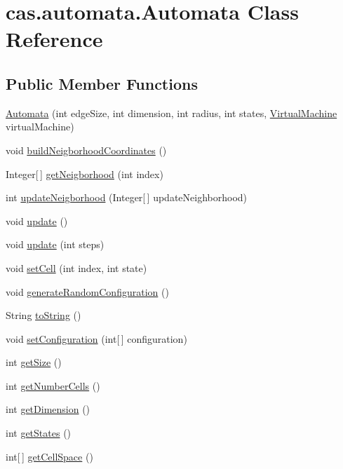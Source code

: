 \hypertarget{classcas_1_1automata_1_1_automata}{\section{cas.\-automata.\-Automata Class Reference}
\label{classcas_1_1automata_1_1_automata}
}
\subsection*{Public Member Functions}
\begin{DoxyCompactItemize}
\item 
\hyperlink{classcas_1_1automata_1_1_automata_a167be64ae393f0acccede8b34eb2fe01}{Automata} (int edge\-Size, int dimension, int radius, int states, \hyperlink{classcas_1_1machine_1_1_virtual_machine}{Virtual\-Machine} virtual\-Machine)
\item 
void \hyperlink{classcas_1_1automata_1_1_automata_ac0c8bfa08108b7c395c0acc22524ee43}{build\-Neigborhood\-Coordinates} ()
\item 
Integer\mbox{[}$\,$\mbox{]} \hyperlink{classcas_1_1automata_1_1_automata_a25246d39284f98b88886e07b909ad2b1}{get\-Neigborhood} (int index)
\item 
int \hyperlink{classcas_1_1automata_1_1_automata_ad6356ae105168abc3d974a4f2d7f8884}{update\-Neigborhood} (Integer\mbox{[}$\,$\mbox{]} update\-Neighborhood)
\item 
void \hyperlink{classcas_1_1automata_1_1_automata_a719d3b4a9839a3f2cb5abc3aefeb60a1}{update} ()
\item 
void \hyperlink{classcas_1_1automata_1_1_automata_ac4f921807b4ee47bbd6d239548e0ffbc}{update} (int steps)
\item 
void \hyperlink{classcas_1_1automata_1_1_automata_a69420deb2c5cc45bc931862683642661}{set\-Cell} (int index, int state)
\item 
void \hyperlink{classcas_1_1automata_1_1_automata_ab44636a24ef1719759e27af66616d9b7}{generate\-Random\-Configuration} ()
\item 
String \hyperlink{classcas_1_1automata_1_1_automata_aaf6d92da07939b9881bba66f4cbfdabb}{to\-String} ()
\item 
void \hyperlink{classcas_1_1automata_1_1_automata_a5505d33bee6fe4a0ca848905a5a4db1e}{set\-Configuration} (int\mbox{[}$\,$\mbox{]} configuration)
\item 
int \hyperlink{classcas_1_1automata_1_1_automata_ab8d1f9f13ddfd86150086234820f1eb2}{get\-Size} ()
\item 
int \hyperlink{classcas_1_1automata_1_1_automata_a16d4ff448a380de7dd768bb0ce8961e8}{get\-Number\-Cells} ()
\item 
int \hyperlink{classcas_1_1automata_1_1_automata_a3e9638dbc5d7897106246cac441fb82b}{get\-Dimension} ()
\item 
int \hyperlink{classcas_1_1automata_1_1_automata_a6fbee4c818b5a5391c538fe7d8a4c2a9}{get\-States} ()
\item 
int\mbox{[}$\,$\mbox{]} \hyperlink{classcas_1_1automata_1_1_automata_a64fd03e09e2f98579032360debcbd456}{get\-Cell\-Space} ()
\end{DoxyCompactItemize}


